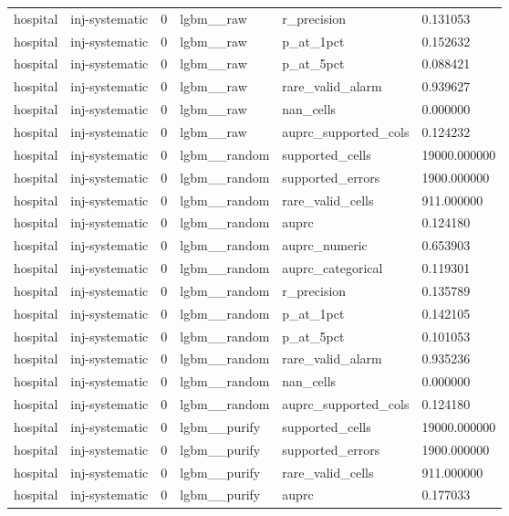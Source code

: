 \begin{tabular}{llllll}
hospital & inj-systematic & 0 & lgbm\_\_raw & r\_precision & 0.131053 \\
hospital & inj-systematic & 0 & lgbm\_\_raw & p\_at\_1pct & 0.152632 \\
hospital & inj-systematic & 0 & lgbm\_\_raw & p\_at\_5pct & 0.088421 \\
hospital & inj-systematic & 0 & lgbm\_\_raw & rare\_valid\_alarm & 0.939627 \\
hospital & inj-systematic & 0 & lgbm\_\_raw & nan\_cells & 0.000000 \\
hospital & inj-systematic & 0 & lgbm\_\_raw & auprc\_supported\_cols & 0.124232 \\
hospital & inj-systematic & 0 & lgbm\_\_random & supported\_cells & 19000.000000 \\
hospital & inj-systematic & 0 & lgbm\_\_random & supported\_errors & 1900.000000 \\
hospital & inj-systematic & 0 & lgbm\_\_random & rare\_valid\_cells & 911.000000 \\
hospital & inj-systematic & 0 & lgbm\_\_random & auprc & 0.124180 \\
hospital & inj-systematic & 0 & lgbm\_\_random & auprc\_numeric & 0.653903 \\
hospital & inj-systematic & 0 & lgbm\_\_random & auprc\_categorical & 0.119301 \\
hospital & inj-systematic & 0 & lgbm\_\_random & r\_precision & 0.135789 \\
hospital & inj-systematic & 0 & lgbm\_\_random & p\_at\_1pct & 0.142105 \\
hospital & inj-systematic & 0 & lgbm\_\_random & p\_at\_5pct & 0.101053 \\
hospital & inj-systematic & 0 & lgbm\_\_random & rare\_valid\_alarm & 0.935236 \\
hospital & inj-systematic & 0 & lgbm\_\_random & nan\_cells & 0.000000 \\
hospital & inj-systematic & 0 & lgbm\_\_random & auprc\_supported\_cols & 0.124180 \\
hospital & inj-systematic & 0 & lgbm\_\_purify & supported\_cells & 19000.000000 \\
hospital & inj-systematic & 0 & lgbm\_\_purify & supported\_errors & 1900.000000 \\
hospital & inj-systematic & 0 & lgbm\_\_purify & rare\_valid\_cells & 911.000000 \\
hospital & inj-systematic & 0 & lgbm\_\_purify & auprc & 0.177033 \\

\end{tabular}
